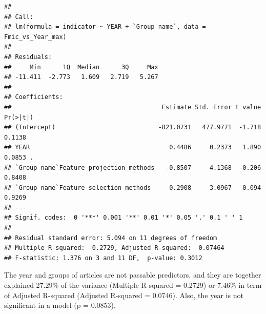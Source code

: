 \documentclass[
]{article}
\begin{document}
\begin{verbatim}
## 
## Call:
## lm(formula = indicator ~ YEAR + `Group name`, data = Fmic_vs_Year_max)
## 
## Residuals:
##     Min      1Q  Median      3Q     Max 
## -11.411  -2.773   1.609   2.719   5.267 
## 
## Coefficients:
##                                         Estimate Std. Error t value Pr(>|t|)  
## (Intercept)                            -821.0731   477.9771  -1.718   0.1138  
## YEAR                                      0.4486     0.2373   1.890   0.0853 .
## `Group name`Feature projection methods   -0.8507     4.1368  -0.206   0.8408  
## `Group name`Feature selection methods     0.2908     3.0967   0.094   0.9269  
## ---
## Signif. codes:  0 '***' 0.001 '**' 0.01 '*' 0.05 '.' 0.1 ' ' 1
## 
## Residual standard error: 5.094 on 11 degrees of freedom
## Multiple R-squared:  0.2729, Adjusted R-squared:  0.07464 
## F-statistic: 1.376 on 3 and 11 DF,  p-value: 0.3012
\end{verbatim}

The year and groups of articles are not passable predictors, and they are together explained 27.29\% of the variance (Multiple R-squared = 0.2729) or 7.46\% in term of Adjusted R-squared (Adjusted R-squared = 0.0746). Also, the year is not significant in a model (p = 0.0853).
\end{document}
